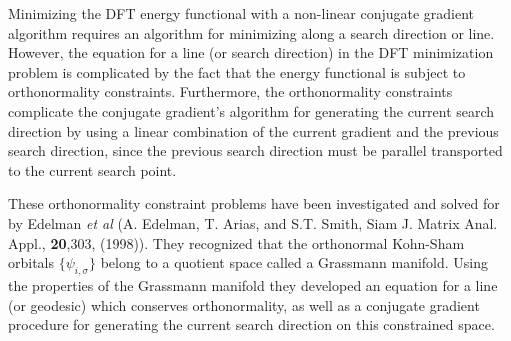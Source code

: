 Minimizing the DFT energy functional with a non-linear conjugate 
gradient algorithm requires an algorithm for minimizing along a 
search direction or line.  However, the equation for a line 
(or search direction) in the DFT minimization problem is complicated 
by the fact that the energy functional is subject to orthonormality 
constraints. 
Furthermore, the orthonormality constraints complicate the
conjugate gradient's algorithm for generating the current search 
direction by using a linear combination of the current gradient and 
the previous search direction, since the previous search direction
must be parallel transported to the current search point.

These orthonormality constraint problems
have been investigated and solved for by Edelman {\it et al} 
(A. Edelman, T. Arias, and S.T. Smith, Siam J. Matrix Anal. Appl., 
\textbf{20},303, (1998)).  
They recognized that the orthonormal Kohn-Sham
orbitals $\{\psi_{i,\sigma}\}$ 
belong to a quotient space called a Grassmann manifold. 
Using the properties of the Grassmann manifold they
developed an equation for a line (or geodesic) which
conserves orthonormality, as well as 
a conjugate gradient procedure for generating the current search direction on this
constrained space.

